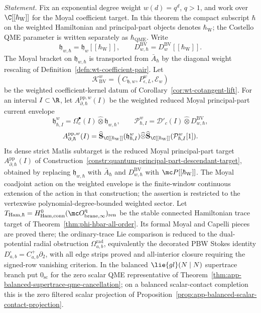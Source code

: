 \documentclass[11pt]{memoir}
\begin{document}
\begin{thm}
	  \noindent
	  \emph{Statement.}
	  Fix an exponential degree weight \(w(d)=q^d\), \(q>1\), and work over
	  \(\C[[\hbar_{\mathrm{W}}]]\) for the Moyal coefficient target.  In
	  this theorem the compact subscript \(\hbar\) on the weighted Hamiltonian
	  and principal-part objects denotes \(\hbar_{\mathrm{W}}\); the Costello
	  QME parameter is written separately as \(\hbar_{\mathrm{QME}}\).  Write
	  \[
	    \mathfrak h_{w,\hbar}=\mathfrak h_w[[\hbar_{\mathrm{W}}]],\qquad
	    D^{\mathrm{BV}}_{w,\hbar}
	      =D^{\mathrm{BV}}_w[[\hbar_{\mathrm{W}}]] .
  \]
  The Moyal bracket on \(\mathfrak h_{w,\hbar}\) is transported from
  \(\bar A_\hbar\) by the diagonal weight rescaling of
  Definition~\ref{defn:wt-coefficient-pair}.
  Let
  \[
    \mathcal K_{\mathrm{BV}}^w
      =(C_{\mathfrak h,w},P_{\epsilon,L}^w,\mathcal E_w)
  \]
  be the weighted coefficient-kernel datum of
  Corollary~\ref{cor:wt-cotangent-lift}.  For an interval \(I\subset\R\), let
  \(A^{\mathrm{pp},w}_{\partial,\hbar}(I)\) be the weighted reduced
  Moyal principal-part current envelope
  \[
    \mathfrak h^w_{\hbar,I}
      =\Omega^\bullet_c(I)\widehat\otimes\mathfrak h_{w,\hbar},\qquad
    \mathcal P^w_{\hbar,I}
      =\mathcal D'_c(I)\widehat\otimes
        D^{\mathrm{BV}}_{w,\hbar},
  \]
	  \[
	    A^{\mathrm{pp},w}_{\partial,\hbar}(I)
	      =
	      \widehat{\mathbf S}_{\C[[\hbar_{\mathrm{W}}]]}(\mathfrak h^w_{\hbar,I})
	      \widehat\otimes
	      \widehat{\mathbf S}_{\C[[\hbar_{\mathrm{W}}]]}(\mathcal P^w_{\hbar,I}[1]).
  \]
  Its dense strict Matlis subtarget is the reduced Moyal
  principal-part target
  \(A^{\mathrm{pp}}_{\partial,\hbar}(I)\) of
  Construction~\ref{constr:quantum-principal-part-descendant-target},
	  obtained by replacing
	  \(\mathfrak h_{w,\hbar}\) with \(\bar A_\hbar\) and
	  \(D^{\mathrm{BV}}_{w,\hbar}\) with
	  \(\mc P[[\hbar_{\mathrm{W}}]]\).  The Moyal coadjoint action on the weighted envelope
  is the finite-window continuous extension of the action in that
  construction; the assertion is restricted to the vertexwise
  polynomial-degree-bounded weighted sector.
  Let
  \(T_{\mathrm{Ham},\hbar}=
  H^0_{\mathrm{Ham,conn}}(\mc O^{\mathrm q}_{\mathrm{brane},\infty})_{\mathrm{ren}}\)
  be the stable connected Hamiltonian trace target of
  Theorem~\ref{thm:phi-hbar-all-order}.  Its formal Moyal and Capelli
  pieces are proved there; the ordinary-trace Lie comparison is reduced
  to the dual-potential radial obstruction
  \(\Omega^{\mathrm{rad}}_{a,b}\), equivalently the decorated PBW Stokes
  identity \(D^\square_{a,b}=C^+_{a,b}\partial_2\), with all edge strips
  proved and all-interior closure requiring the signed-row vanishing
  criterion.  In the balanced
  \(\lie{gl}(N\mid N)\) supertrace branch put
  \(0_{\mathrm{sc}}\) for the zero scalar QME representative of
  Theorem~\ref{thm:app-balanced-supertrace-qme-cancellation}; on a
  balanced scalar-contact completion this is the zero filtered scalar
  projection of
  Proposition~\ref{prop:app-balanced-scalar-contact-projection}.


\end{thm}
\end{document}
